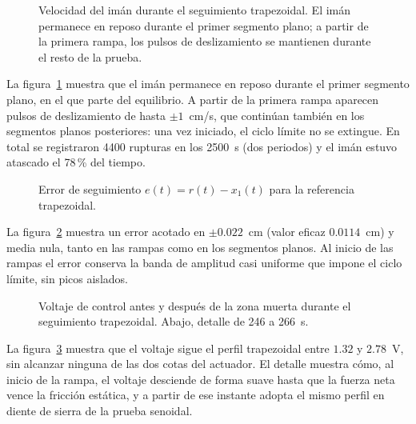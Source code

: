 \FloatBarrier

\begin{figure}[ht]
    \centering
    
    \caption[Seguimiento trapezoidal: velocidad]{Velocidad del imán durante el seguimiento trapezoidal. El imán permanece en reposo durante el primer segmento plano; a partir de la primera rampa, los pulsos de deslizamiento se mantienen durante el resto de la prueba.}
    \label{fig:trap_vel}
\end{figure}

La figura~\ref{fig:trap_vel} muestra que el imán permanece en reposo durante el primer segmento plano, en el que parte del equilibrio. A partir de la primera rampa aparecen pulsos de deslizamiento de hasta $\pm 1$~cm/s, que continúan también en los segmentos planos posteriores: una vez iniciado, el ciclo límite no se extingue. En total se registraron 4400 rupturas en los 2500~s (dos periodos) y el imán estuvo atascado el 78\,\% del tiempo.

\FloatBarrier

\begin{figure}[ht]
    \centering
    
    \caption[Seguimiento trapezoidal: error]{Error de seguimiento $e(t)=r(t)-x_1(t)$ para la referencia trapezoidal.}
    \label{fig:trap_error}
\end{figure}

La figura~\ref{fig:trap_error} muestra un error acotado en $\pm 0.022$~cm (valor eficaz $0.0114$~cm) y media nula, tanto en las rampas como en los segmentos planos. Al inicio de las rampas el error conserva la banda de amplitud casi uniforme que impone el ciclo límite, sin picos aislados.

\FloatBarrier

\begin{figure}[ht]
    \centering
    
    \caption[Seguimiento trapezoidal: señal de control]{Voltaje de control antes y después de la zona muerta durante el seguimiento trapezoidal. Abajo, detalle de 246 a 266~s.}
    \label{fig:trap_ctrl}
\end{figure}

La figura~\ref{fig:trap_ctrl} muestra que el voltaje sigue el perfil trapezoidal entre $1.32$ y $2.78$~V, sin alcanzar ninguna de las dos cotas del actuador. El detalle muestra cómo, al inicio de la rampa, el voltaje desciende de forma suave hasta que la fuerza neta vence la fricción estática, y a partir de ese instante adopta el mismo perfil en diente de sierra de la prueba senoidal.

